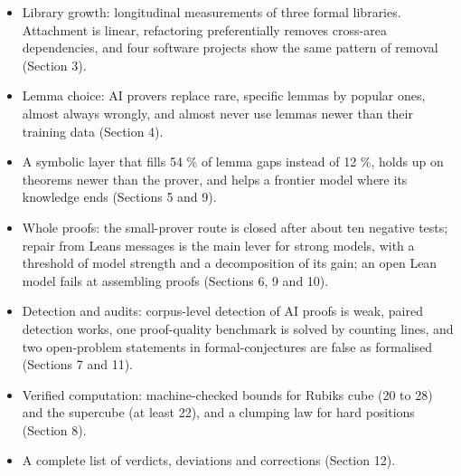 \documentclass[11pt,a4paper]{article}
\providecommand{\tightlist}{\setlength{\itemsep}{0pt}\setlength{\parskip}{0pt}}
\begin{document}
\begin{itemize}
\tightlist
\item
  Library growth: longitudinal measurements of three formal libraries. Attachment is linear, refactoring preferentially removes cross-area dependencies, and four software projects show the same pattern of removal (Section 3).
\item
  Lemma choice: AI provers replace rare, specific lemmas by popular ones, almost always wrongly, and almost never use lemmas newer than their training data (Section 4).
\item
  A symbolic layer that fills 54 \% of lemma gaps instead of 12 \%, holds up on theorems newer than the prover, and helps a frontier model where its knowledge ends (Sections 5 and 9).
\item
  Whole proofs: the small-prover route is closed after about ten negative tests; repair from Lean\textquotesingle s messages is the main lever for strong models, with a threshold of model strength and a decomposition of its gain; an open Lean model fails at assembling proofs (Sections 6, 9 and 10).
\item
  Detection and audits: corpus-level detection of AI proofs is weak, paired detection works, one proof-quality benchmark is solved by counting lines, and two open-problem statements in formal-conjectures are false as formalised (Sections 7 and 11).
\item
  Verified computation: machine-checked bounds for Rubik\textquotesingle s cube (20 to 28) and the supercube (at least 22), and a clumping law for hard positions (Section 8).
\item
  A complete list of verdicts, deviations and corrections (Section 12).
\end{itemize}
\end{document}
